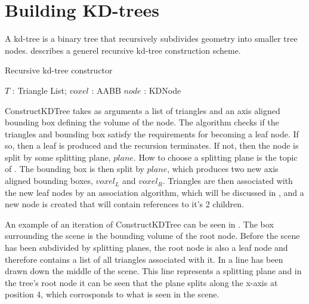 \section{Building KD-trees}

A kd-tree is a binary tree that recursively subdivides geometry into
smaller tree nodes.  describes a generel
recursive kd-tree construction scheme.

\begin{algorithm}
  \caption{Recursive kd-tree constructor}
  \label{alg:kdTreeCreator}
  \begin{algorithmic}
              {$T$ : Triangle List; $voxel$ : AABB}
              {$node$ : KDNode}
              {
                \ELSE
                \ENDIF}
  \end{algorithmic}
\end{algorithm}

ConstructKDTree takes as arguments a list of triangles and an axis
aligned bounding box defining the volume of the node. The algorithm
checks if the triangles and bounding box satisfy the requirements for
becoming a leaf node. If so, then a leaf is produced and the recursion
terminates. If not, then the node is split by some splitting plane,
$plane$. How to choose a splitting plane is the topic of
. The bounding box is then split by
$plane$, which produces two new axis aligned bounding boxes, $voxel_L$
and $voxel_R$. Triangles are then associated with the new leaf nodes
by an association algorithm, which will be discussed in
, and a new node is created that will
contain references to it's 2 children.

An example of an iteration of ConstructKDTree can be seen in
. The box surrounding the scene is the
bounding volume of the root node. Before the scene has been subdivided
by splitting planes, the root node is also a leaf node and therefore
contains a list of all triangles associated with it. In
 a line has been drawn down the middle of the
scene. This line represents a splitting plane and in the tree's root
node it can be seen that the plane splits along the x-axis at position
4, which corrosponds to what is seen in the scene.

